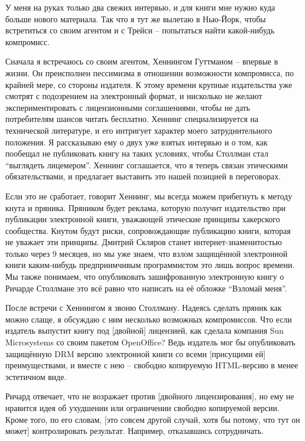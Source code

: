 У меня на руках только два свежих интервью, и для книги мне нужно куда больше нового материала. Так что я тут же вылетаю в Нью-Йорк, чтобы встретиться со своим агентом и с Трейси -- попытаться найти какой-нибудь компромисс.

Сначала я встречаюсь со своим агентом, Хеннингом Гуттманом -- впервые в жизни. Он преисполнен пессимизма в отношении возможности компромисса, по крайней мере, со стороны издателя. К этому времени крупные издательства уже смотрят с подозрением на электронный формат, и нисколько не желают экспериментировать с лицензионными соглашениями, чтобы не дать потребителям шансов читать бесплатно. Хеннинг специализируется на технической литературе, и его интригует характер моего затруднительного положения. Я рассказываю ему о двух уже взятых интервью и о том, как пообещал не публиковать книгу на таких условиях, чтобы Столлман стал \enquote{выглядеть лицемером}. Хеннинг соглашается, что я теперь связан этическими обязательствами, и предлагает выставить это нашей позицией в переговорах.

Если это не сработает, говорит Хеннинг, мы всегда можем прибегнуть к методу кнута и пряника. Пряником будет реклама, которую получит издательство при публикации электронной книги, уважающей этические принципы хакерского сообщества. Кнутом будут риски, сопровождающие публикацию книги, которая не уважает эти принципы. Дмитрий Скляров станет интернет-знаменитостью только через 9 месяцев, но мы уже знаем, что взлом защищённой электронной книги каким-нибудь предприимчивым программистом это лишь вопрос времени. Мы также понимаем, что опубликовать зашифрованную электронную книгу о Ричарде Столлмане это всё равно что написать на её обложке \enquote{Взломай меня}.

После встречи с Хеннингом я звоню Столлману. Надеясь сделать пряник как можно слаще, я обсуждаю с ним несколько возможных компромиссов. Что если издатель выпустит книгу под [двойной] лицензией, как сделала компания Sun Microsystems со своим пакетом OpenOffice? Ведь издатель мог бы опубликовать защищённую DRM  версию электронной книги со всеми [присущими ей] преимуществами, и вместе с нею -- свободно копируемую HTML-версию в менее эстетичном виде.

Ричард отвечает, что не возражает против [двойного лицензирования], но ему не нравится идея об ухудшении или ограничении свободно копируемой версии. Кроме того, по его словам, [это совсем другой случай, хотя бы потому, что тут он может] контролировать результат. Например, отказавшись сотрудничать.


